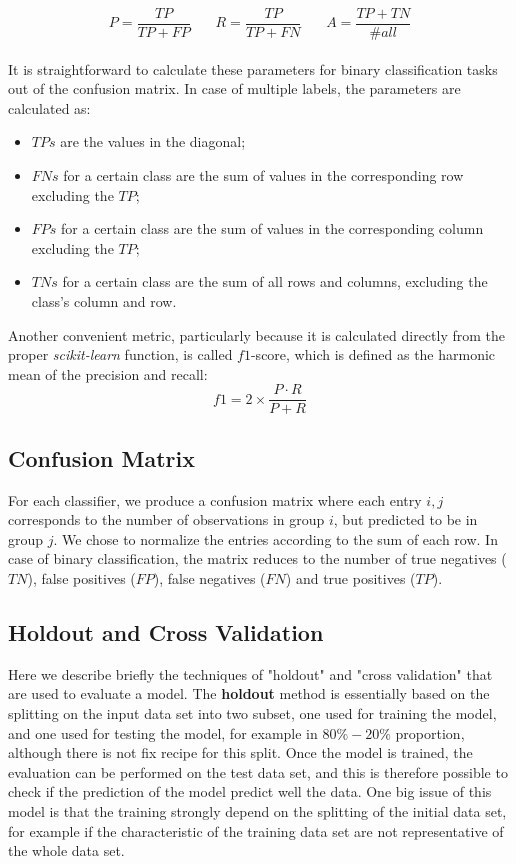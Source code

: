 \documentclass{article}
\begin{document}
\begin{equation}
P = \frac{TP}{TP + FP} \ \ \ \ \ \ \ \  R = \frac{TP}{TP + FN} \ \ \ \ \ \ \ \  A = \frac{TP + TN}{\#all} \label{eq:model_training_parameters}
\end{equation}
\\

It is straightforward to calculate these parameters for binary classification tasks out of the confusion matrix. In case of multiple labels, the parameters are calculated as:
\begin{itemize}
	\item  $TPs$ are the values in the diagonal; \
	\item  $FNs$ for a certain class are the sum of values in the corresponding row excluding the $TP$; \
	\item  $FPs$ for a certain class are the sum of values in the corresponding column excluding the $TP$; \
	\item  $TNs$ for a certain class are the sum of all rows and columns, excluding the class's column and row. \
\end{itemize}


Another convenient metric, particularly because it is calculated directly from the proper \textit{scikit-learn} function, is called $f1$-score, which is defined as the harmonic mean of the precision and recall:
\begin{equation}
f1 = 2 \times \frac{P \cdot R }{P + R }
\end{equation}


\subsection{Confusion Matrix}
For each classifier, we produce a confusion matrix where each entry $i,j$ corresponds to the number of observations in group $i$, but predicted to be in group $j$. We chose to normalize the entries according to the sum of each row.
In case of binary classification, the matrix reduces to the number of true negatives ($TN$), false positives ($FP$), false negatives ($FN$) and true positives ($TP$).

\subsection{Holdout and Cross Validation}\label{sec:cross}
Here we describe briefly the techniques of "holdout" and "cross validation" that are used to evaluate a model. The \textbf{holdout} method is essentially based on the splitting on the input data set into two subset, one used for training the model, and one used for testing the model, for example in $80\%-20\%$ proportion, although there is not fix recipe for this split. Once the model is trained, the evaluation can be performed on the test data set, and this is therefore possible to check if the prediction of the model predict well the data. One big issue of this model is that the training strongly depend on the splitting of the initial data set, for example if the characteristic of the training data set are not representative of the whole data set.
\end{document}

